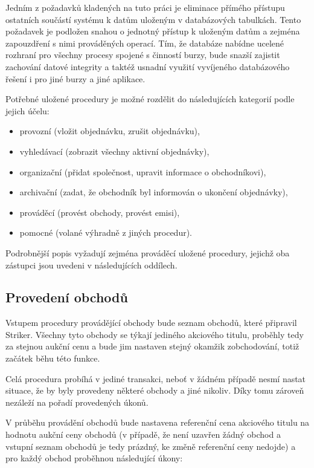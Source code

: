 \documentclass[thesis=M,czech]{FITthesis}[2012/06/26]
\begin{document}
Jedním z požadavků kladených na tuto práci je eliminace přímého přístupu ostatních součástí systému k datům uloženým v databázových 
tabulkách. Tento požadavek je podložen snahou o jednotný přístup k uloženým datům a zejména zapouzdření s nimi prováděných operací. 
Tím, že databáze nabídne ucelené rozhraní pro všechny procesy spojené s činností burzy, bude snazší zajistit zachování datové integrity 
a taktéž usnadní využití vyvíjeného databázového řešení i pro jiné burzy a jiné aplikace.

Potřebné uložené procedury je možné rozdělit do následujících kategorií podle jejich účelu:

\begin{itemize}
	\item provozní (vložit objednávku, zrušit objednávku),  
	\item vyhledávací (zobrazit všechny aktivní objednávky), 
	\item organizační (přidat společnost, upravit informace o obchodníkovi), 
	\item archivační (zadat, že obchodník byl informován o ukončení objednávky),
	\item prováděcí (provést obchody, provést emisi),
	\item pomocné (volané výhradně z jiných procedur).
\end{itemize}

Podrobnější popis vyžadují zejména prováděcí uložené procedury, jejichž oba zástupci jsou uvedeni v následujících oddílech.


\subsection{Provedení obchodů}
\label{sec:processtrades}

Vstupem procedury provádějící obchody bude seznam obchodů, které připravil Striker. Všechny tyto obchody se týkají jediného 
akciového titulu, proběhly tedy za stejnou aukční cenu a bude jim nastaven stejný okamžik zobchodování, totiž začátek běhu této 
funkce. 

Celá procedura probíhá v jediné transakci, neboť v žádném případě nesmí nastat situace, že by byly provedeny některé obchody 
a jiné nikoliv. Díky tomu zároveň nezáleží na pořadí provedených úkonů.

V průběhu provádění obchodů bude nastavena referenční cena akciového titulu na hodnotu aukční ceny obchodů (v případě, že 
není uzavřen žádný obchod a vstupní seznam obchodů je tedy prázdný, ke změně referenční ceny nedojde) a pro každý 
obchod proběhnou následující úkony:
\end{document}
